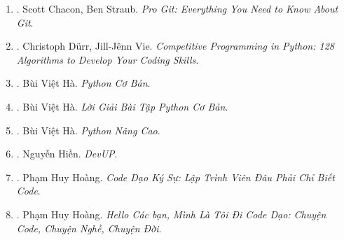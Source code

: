 \documentclass{article}
\begin{document}
\begin{enumerate}
\begin{itemize}
		\item ``A data structure is a way to store \& organize data in order to facilitate access \& modifications.''
		\item ``Machine learning can be thought of as a method for performing algorithmic tasks without explicitly designing an algorithm, but instead inferring patterns from data \& thereby automatically learning a solution.''
		\item ``The running time of an algorithm on a particular input is the number of instructions \& data accesses executed.''
	\end{itemize}
	{\sf About Author.} {\sc Thomas H. Cormen} is Emeritus Professor of Computer Science at Dartmouth College. {\sc Charles E. Leiserson} is Edwin Sibley Webster Professor in Electrical Engineering \& Computer Science at MIT. {\sc Ronald L. Rivest} is Institute Professor at MIT. {\sc Clifford Stein} is Wai T. Chang Professor of Industrial Engineering \& Operations Research, \& of Computer Science at Columbia University.

	\item \cite{Chacon_Straub2014}. Scott Chacon, Ben Straub. {\it Pro Git: Everything You Need to Know About Git}.\hfill{\sf[reading]}

	\item \cite{Durr_Vie2021}. Christoph D\"urr, Jill-J\^enn Vie. {\it Competitive Programming in Python: 128 Algorithms to Develop Your Coding Skills}.

	\item \cite{Ha_Python_co_ban}. Bùi Việt Hà. {\it Python Cơ Bản}.\hfill{\sf[done]}

	\item \cite{Ha_loi_giai_BT_Python_co_ban}. Bùi Việt Hà. {\it Lời Giải Bài Tập Python Cơ Bản}.\hfill{\sf[reading]}

	\item \cite{Ha_Python_nang_cao}. Bùi Việt Hà. {\it Python Nâng Cao}.\hfill{\sf[done]}

	\item \cite{Hien_DevUp}. Nguyễn Hiền. {\it DevUP}.\hfill{\sf[done]}

	\item \cite{Hoang_code_dao_ky_su}. Phạm Huy Hoàng. {\it Code Dạo Ký Sự: Lập Trình Viên Đâu Phải Chỉ Biết Code}.\hfill{\sf[done]}

	\item \cite{Hoang_toi_di_code_dao}. Phạm Huy Hoàng. {\it Hello Các bạn, Mình Là Tôi Đi Code Dạo: Chuyện Code, Chuyện Nghề, Chuyện Đời}.\hfill{\sf[done]}


\end{enumerate}
\end{document}
